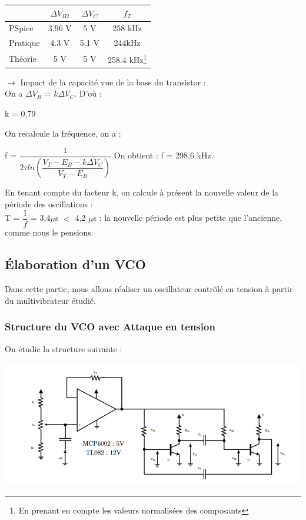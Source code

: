 \documentclass[a4paper]{report}
\begin{document}
\begin{center}
\begin{tabular}{| l | c | c | c |}
\hline
 $ $ & $\Delta V_{B2}$ & $\Delta V_{C}$ & $f_T$\\
\hline
PSpice & 3.96 V & 5 V & 258 kHz   \\
\hline
Pratique & 4.3 V & 5.1 V & 244kHz   \\
\hline
Théorie & 5 V & 5 V & 258.4 kHz\footnote{En prenant en compte les valeurs normalisées des composants} \\
\hline

\end{tabular}
\end{center}
 $\rightarrow$ Impact de la capacité vue de la base du transistor : \\
 On a $\Delta V_B$ = $k\Delta V_C$. D'où :\\
 \begin{center}
 k = 0,79\\
 \end{center}

On recalcule la fréquence, on a : \\
\begin{center}
f = $\dfrac{1}{2\tau ln(\dfrac{V_T - E_B - k\Delta V_C}{V_T - E_B})}$
On obtient : f = 298,6 kHz.
\end{center}

En tenant compte du facteur k, on calcule à présent la nouvelle valeur de la période des oscillations : \\
T = $\dfrac{1}{f}$ = 3,4$\mu$s $<$ 4,2 $\mu$s : la nouvelle période est plus petite que l'ancienne, comme nous le pensions.\\


\subsection{Élaboration d'un VCO}
Dans cette partie, nous allons réaliser un oscillateur contrôlé en tension à partir du multivibrateur étudié.

\subsubsection{Structure du VCO avec Attaque en tension}

On étudie la structure suivante :

\begin{center}
\includegraphics[width=1\textwidth]{VCO_tension.PNG}
\end{center}
\end{document}
